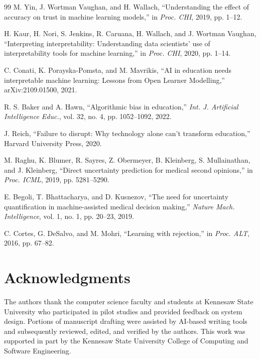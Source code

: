\documentclass[journal]{IEEEtran}
\begin{document}
\begin{thebibliography}{99}
M. Yin, J. Wortman Vaughan, and H. Wallach, ``Understanding the effect of accuracy on trust in machine learning models,'' in \textit{Proc. CHI}, 2019, pp. 1--12.

H. Kaur, H. Nori, S. Jenkins, R. Caruana, H. Wallach, and J. Wortman Vaughan, ``Interpreting interpretability: Understanding data scientists' use of interpretability tools for machine learning,'' in \textit{Proc. CHI}, 2020, pp. 1--14.

C. Conati, K. Porayska-Pomsta, and M. Mavrikis, ``AI in education needs interpretable machine learning: Lessons from Open Learner Modelling,'' arXiv:2109.01500, 2021.

R. S. Baker and A. Hawn, ``Algorithmic bias in education,'' \textit{Int. J. Artificial Intelligence Educ.}, vol. 32, no. 4, pp. 1052--1092, 2022.

J. Reich, ``Failure to disrupt: Why technology alone can't transform education,'' Harvard University Press, 2020.

M. Raghu, K. Blumer, R. Sayres, Z. Obermeyer, B. Kleinberg, S. Mullainathan, and J. Kleinberg, ``Direct uncertainty prediction for medical second opinions,'' in \textit{Proc. ICML}, 2019, pp. 5281--5290.

E. Begoli, T. Bhattacharya, and D. Kusnezov, ``The need for uncertainty quantification in machine-assisted medical decision making,'' \textit{Nature Mach. Intelligence}, vol. 1, no. 1, pp. 20--23, 2019.

C. Cortes, G. DeSalvo, and M. Mohri, ``Learning with rejection,'' in \textit{Proc. ALT}, 2016, pp. 67--82.

\end{thebibliography}


\section*{Acknowledgments}

The authors thank the computer science faculty and students at Kennesaw State University who participated in pilot studies and provided feedback on system design. Portions of manuscript drafting were assisted by AI-based writing tools and subsequently reviewed, edited, and verified by the authors. This work was supported in part by the Kennesaw State University College of Computing and Software Engineering.
\end{document}
